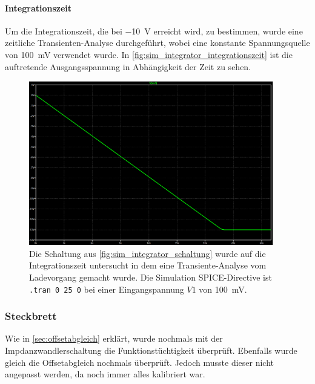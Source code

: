 \documentclass[12pt,english,ngerman]{scrartcl}
\begin{document}
\paragraph{Integrationszeit}
Um die Integrationszeit, die bei \SI{-10}{\volt} erreicht wird, zu bestimmen,
wurde eine zeitliche Transienten-Analyse durchgeführt, wobei eine konstante
Spannungsquelle von \SI{100}{\milli\volt} verwendet wurde. In
\autoref{fig:sim_integrator_integrationszeit} ist die auftretende
Ausgangsspannung in Abhängigkeit der Zeit zu sehen.


\begin{figure}[H]
  \centering
    \includegraphics[width=0.95\textwidth]{./figures/integrator/sim/umkehr_int/dauer_aussteu.png}
  \caption{Die Schaltung aus \autoref{fig:sim_integrator_schaltung} wurde auf
  die Integrationszeit untersucht in dem eine Transiente-Analyse vom
  Ladevorgang gemacht wurde. Die Simulation SPICE-Directive ist \texttt{.tran 0 25 0} 
  bei einer Eingangspannung $V1$ von \SI{100}{\milli\volt}.}
  \label{fig:sim_integrator_integrationszeit}
\end{figure}

\subsubsection{Steckbrett}
Wie in \autoref{sec:offsetabgleich} erklärt, wurde nochmals mit der
Impdanzwandlerschaltung die Funktionstüchtigkeit überprüft. Ebenfalls wurde
gleich die Offsetabgleich nochmals überprüft. Jedoch musste dieser nicht
angepasst werden, da noch immer alles kalibriert war.
\end{document}
